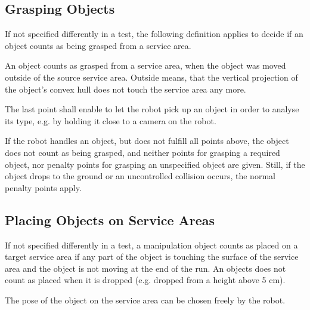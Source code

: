 \subsection{Grasping Objects} \label{ssec:GraspingObjects}
If not specified differently in a test, the following definition applies to decide if an object counts as being grasped from a service area.
\par
An object counts as grasped from a service area, when the object was moved outside of the source service area. Outside means, that the vertical projection of the object’s convex hull does not touch the service area any more.

\par
The last point shall enable to let the robot pick up an object in order to analyse its type, e.g. by holding it close to a camera on the robot.
\par
If the robot handles an object, but does not fulfill all points above, the object does not count as being grasped, and neither points for grasping a required object, nor penalty points for grasping an unspecified object are given. Still, if the object drops to the ground or an uncontrolled collision occurs, the normal penalty points apply.

\subsection{Placing Objects on Service Areas} \label{ssec:PlacingObjects}
If not specified differently in a test, a manipulation object counts as placed on a target service area if any part of the object is touching the surface of the service area and the object is not moving at the end of the run. An objects does not count as placed when it is dropped (e.g. dropped from a height above 5 cm). 
\par
The pose of the object on the service area can be chosen freely by the robot.


